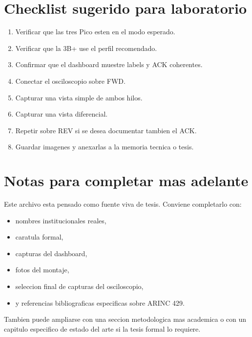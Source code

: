 \documentclass[12pt,a4paper,oneside]{report}
\begin{document}
\chapter{Checklist sugerido para laboratorio}

\begin{enumerate}[leftmargin=1.2cm]
    \item Verificar que las tres Pico esten en el modo esperado.
    \item Verificar que la 3B+ use el perfil recomendado.
    \item Confirmar que el dashboard muestre labels y ACK coherentes.
    \item Conectar el osciloscopio sobre FWD.
    \item Capturar una vista simple de ambos hilos.
    \item Capturar una vista diferencial.
    \item Repetir sobre REV si se desea documentar tambien el ACK.
    \item Guardar imagenes y anexarlas a la memoria tecnica o tesis.
\end{enumerate}

\chapter{Notas para completar mas adelante}

Este archivo esta pensado como fuente viva de tesis. Conviene completarlo con:

\begin{itemize}[leftmargin=1.2cm]
    \item nombres institucionales reales,
    \item caratula formal,
    \item capturas del dashboard,
    \item fotos del montaje,
    \item seleccion final de capturas del osciloscopio,
    \item y referencias bibliograficas especificas sobre ARINC 429.
\end{itemize}

Tambien puede ampliarse con una seccion metodologica mas academica o con un capitulo especifico de estado del arte si la tesis formal lo requiere.
\end{document}
